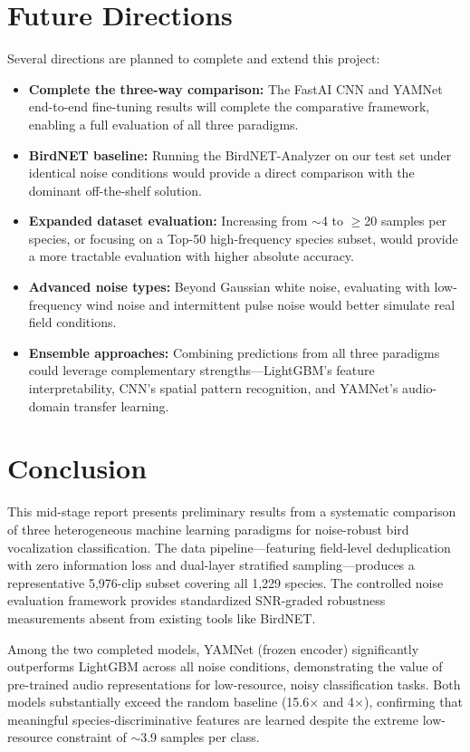 \documentclass[conference]{IEEEtran}
\begin{document}
\section{Future Directions}
Several directions are planned to complete and extend this project:
\begin{itemize}
\item \textbf{Complete the three-way comparison:} The FastAI CNN and YAMNet end-to-end fine-tuning results will complete the comparative framework, enabling a full evaluation of all three paradigms.
\item \textbf{BirdNET baseline:} Running the BirdNET-Analyzer on our test set under identical noise conditions would provide a direct comparison with the dominant off-the-shelf solution.
\item \textbf{Expanded dataset evaluation:} Increasing from $\sim$4 to $\geq$20 samples per species, or focusing on a Top-50 high-frequency species subset, would provide a more tractable evaluation with higher absolute accuracy.
\item \textbf{Advanced noise types:} Beyond Gaussian white noise, evaluating with low-frequency wind noise and intermittent pulse noise would better simulate real field conditions.
\item \textbf{Ensemble approaches:} Combining predictions from all three paradigms could leverage complementary strengths---LightGBM's feature interpretability, CNN's spatial pattern recognition, and YAMNet's audio-domain transfer learning.
\end{itemize}

\section{Conclusion}
This mid-stage report presents preliminary results from a systematic comparison of three heterogeneous machine learning paradigms for noise-robust bird vocalization classification. The data pipeline---featuring field-level deduplication with zero information loss and dual-layer stratified sampling---produces a representative 5,976-clip subset covering all 1,229 species. The controlled noise evaluation framework provides standardized SNR-graded robustness measurements absent from existing tools like BirdNET.

Among the two completed models, YAMNet (frozen encoder) significantly outperforms LightGBM across all noise conditions, demonstrating the value of pre-trained audio representations for low-resource, noisy classification tasks. Both models substantially exceed the random baseline (15.6$\times$ and 4$\times$), confirming that meaningful species-discriminative features are learned despite the extreme low-resource constraint of $\sim$3.9 samples per class.
\end{document}

